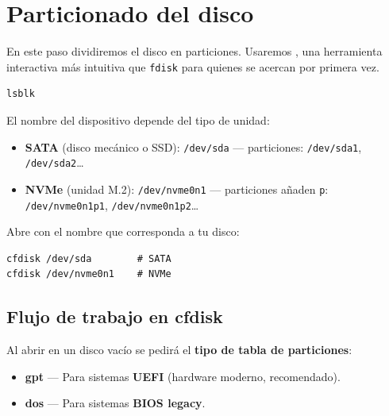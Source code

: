 \section{Particionado del disco}

En este paso dividiremos el disco en particiones. Usaremos ,
una herramienta interactiva más intuitiva que \texttt{fdisk} para quienes se acercan por primera vez.

\begin{tcolorbox}[colback=blue!5, colframe=blue!50!black, title={\faInfoCircle\hspace*{0.5em} Identificar el disco antes de empezar}]
\begin{lstlisting}[style=bashstyle]
lsblk
\end{lstlisting}
El nombre del dispositivo depende del tipo de unidad:
\begin{itemize}
  \item \textbf{SATA} (disco mecánico o SSD): \texttt{/dev/sda} — particiones: \texttt{/dev/sda1}, \texttt{/dev/sda2}\ldots
  \item \textbf{NVMe} (unidad M.2): \texttt{/dev/nvme0n1} — particiones añaden \texttt{p}: \texttt{/dev/nvme0n1p1}, \texttt{/dev/nvme0n1p2}\ldots
\end{itemize}
\end{tcolorbox}

Abre  con el nombre que corresponda a tu disco:

\begin{tcolorbox}[title=Abrir cfdisk]
\begin{lstlisting}[style=bashstyle]
cfdisk /dev/sda        # SATA
cfdisk /dev/nvme0n1    # NVMe
\end{lstlisting}
\end{tcolorbox}

\subsection{Flujo de trabajo en cfdisk}

Al abrir  en un disco vacío se pedirá el \textbf{tipo de tabla de particiones}:
\begin{itemize}
  \item \textbf{gpt} — Para sistemas \textbf{UEFI} (hardware moderno, recomendado).
  \item \textbf{dos} — Para sistemas \textbf{BIOS legacy}.
\end{itemize}

